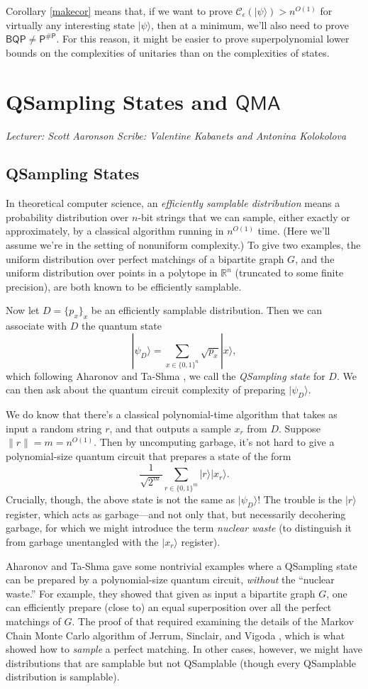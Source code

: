 \documentclass[11pt]{report}
\theoremstyle{plain}
\theoremstyle{definition}
\newcommand{\R}{{\mathbb R}}
\renewcommand{\ket}[1]{|#1\rangle}
\newcommand{\sizee}{\ensuremath{\mathcal{C}_\epsilon}}
\newcommand{\lecture}[3]{%
  \chapter{#3}%
  \vspace{-5ex}%
  \textit{Lecturer: #1 \hfill Scribe: #2}\par%
  \vspace{1ex}\titlerule\vspace{2ex}}
\begin{document}
Corollary \ref{makecor} means that, if we want to prove $\sizee(\ket{\psi}) > n^{O(1)}$ for virtually any interesting state $\ket{\psi}$, then at a minimum, we'll also need to prove $\mathsf{BQP} \neq \mathsf{P^{\#P}}$.  For this reason, it might be easier to prove superpolynomial lower bounds on the complexities of unitaries than on the complexities of states.


\lecture{Scott Aaronson}{Valentine Kabanets and Antonina Kolokolova}{QSampling States and $\mathsf{QMA}$}

\section{QSampling States}

In theoretical computer science, an {\em efficiently samplable distribution} means a probability distribution over $n$-bit strings that we can sample, either exactly or approximately, by a classical algorithm running in $n^{O(1)}$ time.  (Here we'll assume we're in the setting of nonuniform complexity.)  To give two examples, the uniform distribution over perfect matchings of a bipartite graph $G$, and the uniform distribution over points in a polytope in $\R^n$ (truncated to some finite precision), are both known to be efficiently samplable.

Now let $D=\{p_x\}_x$ be an efficiently samplable distribution. Then we can associate with $D$ the quantum state
\[
\ket{\psi_D} = \sum_{x \in \{0,1\}^n} \sqrt{p_x} \ket{x},
\]
which following Aharonov and Ta-Shma \cite{at}, we call the {\em QSampling state} for $D$.  We can then ask about the quantum circuit complexity of preparing $\ket{\psi_D}$.

We do know that there's a classical polynomial-time algorithm that takes as input a random string $r$, and that outputs a sample $x_r$ from $D$.  Suppose $\|r\| = m = n^{O(1)}$.  Then by uncomputing garbage, it's not hard to give a polynomial-size quantum circuit that prepares a state of the form
\[
\frac{1}{\sqrt{2^m}} \sum_{r \in \{0,1\}^m} \ket{r} \ket{x_r}.
\]
Crucially, though, the above state is not the same as $\ket{\psi_D}$!  The trouble is the $\ket{r}$ register, which acts as garbage---and not only that, but necessarily decohering garbage, for which we might introduce the term {\em nuclear waste} (to distinguish it from garbage unentangled with the $\ket{x_r}$ register).

Aharonov and Ta-Shma \cite{at} gave some nontrivial examples where a QSampling state can be prepared by a polynomial-size quantum circuit, {\em without} the ``nuclear waste.''  For example, they showed that given as input a bipartite graph $G$, one can efficiently prepare (close to) an equal superposition over all the perfect matchings of $G$.  The proof of that
required examining the details of the Markov Chain Monte Carlo algorithm of Jerrum, Sinclair, and Vigoda \cite{jsv}, which is what showed how to {\em sample} a perfect matching.  In other cases, however, we might have distributions that are samplable but not QSamplable (though every QSamplable distribution is samplable).
\end{document}
